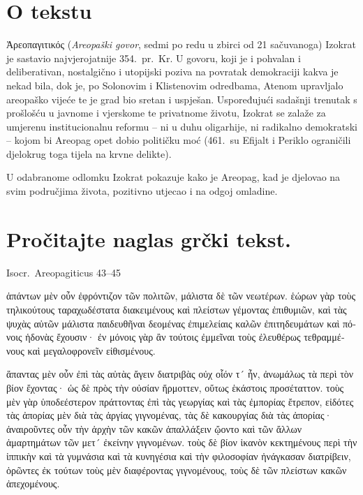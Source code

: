 


\section*{O tekstu}

Ἀρεοπαγιτικός (\textit{Areopaški govor}, sedmi po redu u zbirci od 21 sačuvanoga) Izokrat je sastavio najvjerojatnije 354.\ pr.~Kr. U govoru, koji je i pohvalan i deliberativan, nostalgično i utopijski poziva na povratak demokraciji kakva je nekad bila, dok je, po Solonovim i Klistenovim odredbama, Atenom upravljalo areopaško vijeće te je grad bio sretan i uspješan. Uspoređujući sadašnji trenutak s prošlošću u javnome i vjerskome te privatnome životu, Izokrat se zalaže za umjerenu institucionalnu reformu – ni u duhu oligarhije, ni radikalno demokratski – kojom bi Areopag opet dobio političku moć (461.\ su Efijalt i Periklo ograničili djelokrug toga tijela na krvne delikte).

U odabranome odlomku Izokrat pokazuje kako je Areopag, kad je djelovao na svim područjima života, pozitivno utjecao i na odgoj omladine.

\newpage

\section*{Pročitajte naglas grčki tekst.}

Isocr.\ Areopagiticus 43–45


\medskip


{\large

\begin{greek}

\noindent  ἁπάντων μὲν οὖν ἐφρόντιζον τῶν πολιτῶν, μάλιστα δὲ τῶν νεωτέρων. ἑώρων γὰρ τοὺς τηλικούτους ταραχωδέστατα διακειμένους καὶ πλείστων γέμοντας ἐπιθυμιῶν, καὶ τὰς ψυχὰς αὐτῶν μάλιστα παιδευθῆναι δεομένας ἐπιμελείαις καλῶν ἐπιτηδευμάτων καὶ πόνοις ἡδονὰς ἔχουσιν· ἐν μόνοις γὰρ ἂν τούτοις ἐμμεῖναι τοὺς ἐλευθέρως τεθραμμένους καὶ μεγαλοφρονεῖν εἰθισμένους.

\noindent  ἅπαντας μὲν οὖν ἐπὶ τὰς αὐτὰς ἄγειν διατριβὰς οὐχ οἷόν τ´ ἦν, ἀνωμάλως τὰ περὶ τὸν βίον ἔχοντας· ὡς δὲ πρὸς τὴν οὐσίαν ἥρμοττεν, οὕτως ἑκάστοις προσέταττον. τοὺς μὲν γὰρ ὑποδεέστερον πράττοντας ἐπὶ τὰς γεωργίας καὶ τὰς ἐμπορίας ἔτρεπον, εἰδότες τὰς ἀπορίας μὲν διὰ τὰς ἀργίας γιγνομένας, τὰς δὲ κακουργίας διὰ τὰς ἀπορίας· ἀναιροῦντες οὖν τὴν ἀρχὴν τῶν κακῶν ἀπαλλάξειν ᾤοντο καὶ τῶν ἄλλων ἁμαρτημάτων τῶν μετ´ ἐκείνην γιγνομένων. τοὺς δὲ βίον ἱκανὸν κεκτημένους περὶ τὴν ἱππικὴν καὶ τὰ γυμνάσια καὶ τὰ κυνηγέσια καὶ τὴν φιλοσοφίαν ἠνάγκασαν διατρίβειν, ὁρῶντες ἐκ τούτων τοὺς μὲν διαφέροντας γιγνομένους, τοὺς δὲ τῶν πλείστων κακῶν ἀπεχομένους.
\end{greek}

}

